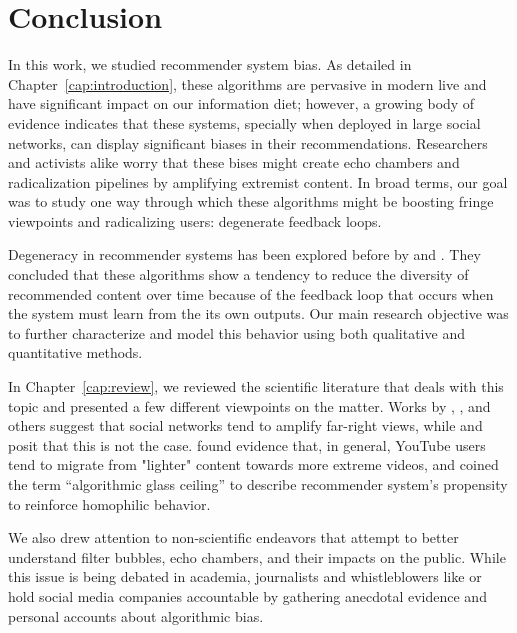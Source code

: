
\chapter{Conclusion}
\label{cap:conclusion}

In this work, we studied recommender system bias. As detailed in
Chapter~\ref{cap:introduction}, these algorithms are pervasive in modern live
and have significant impact on our information diet; however, a growing body of
evidence indicates that these systems, specially when deployed in large social
networks, can display significant biases in their recommendations. Researchers
and activists alike worry that these bises might create echo chambers and
radicalization pipelines by amplifying extremist content. In broad terms, our
goal was to study one way through which these algorithms might be boosting
fringe viewpoints and radicalizing users: degenerate feedback loops.

Degeneracy in recommender systems has been explored before by
\citet{nguyen_exploring_2014} and \citet{jiang_degenerate_2019}. They concluded
that these algorithms show a tendency to reduce the diversity of recommended
content over time because of the feedback loop that occurs when the system must
learn from the its own outputs. Our main research objective was to further
characterize and model this behavior using both qualitative and quantitative
methods.

In Chapter~\ref{cap:review}, we reviewed the scientific literature that deals
with this topic and presented a few different viewpoints on the matter. Works by
\citet{hosseinmardi_evaluating_2020}, \citet{huszar_algorithmic_2021}, and
others suggest that social networks tend to amplify far-right views, while
\citet{munger_right-wing_2020} and \citet{ledwich_algorithmic_2019} posit that
this is not the case. \citet{ribeiro_auditing_2020} found evidence that, in
general, YouTube users tend to migrate from "lighter" content towards more
extreme videos, and \citet{stoica_algorithmic_2018} coined the term
``algorithmic glass ceiling'' to describe recommender system's propensity to
reinforce homophilic behavior.

We also drew attention to non-scientific endeavors that attempt to better
understand filter bubbles, echo chambers, and their impacts on the public. While
this issue is being debated in academia, journalists and whistleblowers like
\citet{ribeiro_como_2021} or \citet{wong_how_2021} hold social media companies
accountable by gathering anecdotal evidence and personal accounts about
algorithmic bias.

